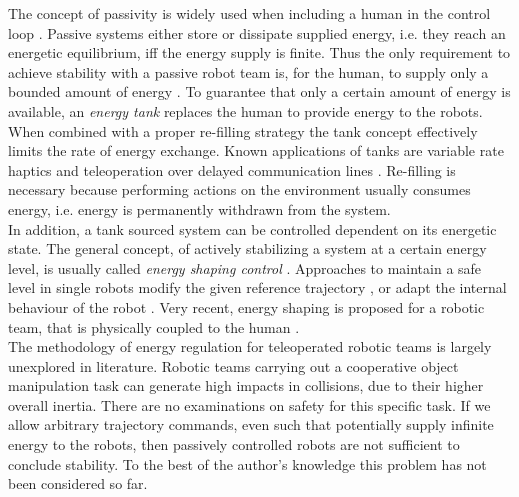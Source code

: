 \documentclass[a4paper,twoside, openright,12pt]{report}
\begin{document}
The concept of passivity is widely used when including a human in the control loop \cite{Hirche_12}. Passive systems either store or dissipate supplied energy, i.e. they reach an energetic equilibrium, iff the energy supply is finite. Thus the only requirement to achieve stability with a passive robot team is, for the human, to supply only a bounded amount of energy \cite{Stramigioli_15}. To guarantee that only a certain amount of energy is available, an \emph{energy tank} replaces the human to provide energy to the robots. When combined with a proper re-filling strategy the tank concept effectively limits the rate of energy exchange. Known applications of tanks are variable rate haptics \cite{Lee_10} and teleoperation over delayed communication lines \cite{Franken_11}. Re-filling is necessary because performing actions on the environment usually consumes energy, i.e. energy is permanently withdrawn from the system.\\ 
In addition, a tank sourced system can be controlled dependent on its energetic state. The general concept, of actively stabilizing a system at a certain energy level, is usually called \emph{energy shaping control} \cite{Ortega_99}. Approaches to maintain a safe level in single robots modify the given reference trajectory \cite{Laffranchi_09}, or adapt the internal behaviour of the robot \cite{Tadele_14}. Very recent, energy shaping is proposed for a robotic team, that is physically coupled to the human \cite{Geravand_16}.\\
The methodology of energy regulation for teleoperated robotic teams is largely unexplored in literature. Robotic teams carrying out a cooperative object manipulation task can generate high impacts in collisions, due to their higher overall inertia. There are no examinations on safety for this specific task. If we allow arbitrary trajectory commands, even such that potentially supply infinite energy to the robots, then passively controlled robots are not sufficient to conclude stability. To the best of the author's knowledge this problem has not been considered so far.







\end{document}
